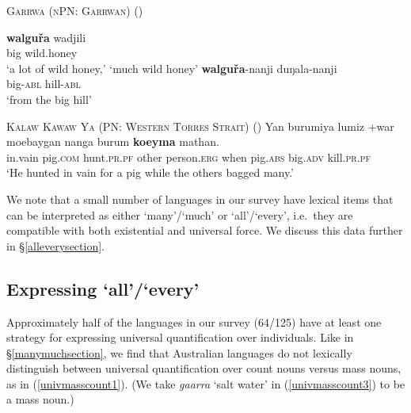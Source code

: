 \documentclass[12pt,egregdoesnotlikesansseriftitles]{scrartcl}
\makeatletter
\newcommand{\ofy}{/125} %
\makeatother
\begin{document}
\begin{exe}
  \ex \textsc{Garrwa (nPN: Garrwan)} (\citealt{furby77}) \label{bigquant1}
  \begin{xlist}
    \ex \gll \textbf{walgu\v{r}a} wadjili \\
    big wild.honey\\
    \glt `a lot of wild honey,' `much wild honey' %
    \ex \gll \textbf{walgu\v{r}a}-nanji duŋala-nanji\\
    big-\textsc{abl} hill-\textsc{abl}\\
    \glt `from the big hill' %
\end{xlist}    
  \ex \textsc{Kalaw Kawaw Ya (PN: Western Torres Strait)} (\citealt[141]{fo91}) \label{bigquant2}
  \gll Yan burumiya lumiz +war moebaygan nanga burum        \textbf{koeyma}    mathan.\\
  in.vain pig.\textsc{com} hunt.\textsc{pr.pf} other person.\textsc{erg} when   pig.\textsc{abs}    big.\textsc{adv}    kill.\textsc{pr.pf}\\
  \glt `He hunted in vain for a pig while the others bagged many.'
  
\end{exe}

We note  that a small number of languages in our survey have lexical items that can be interpreted as either `many'/`much' or `all'/`every', i.e.\ they are compatible with both existential and universal force. We discuss this data further in \S\ref{alleverysection}.

\subsection{Expressing `all'/`every' \label{alleverysection}}

Approximately half of the languages in our survey (64\ofy) have at least one strategy for expressing universal quantification over individuals. Like in \S\ref{manymuchsection}, we find that Australian languages do not lexically distinguish between universal quantification over count nouns versus mass nouns, as in (\ref{univmasscount1}). (We take \textit{gaarra} `salt water' in (\ref{univmasscount3}) to be a mass noun.)
\end{document}
